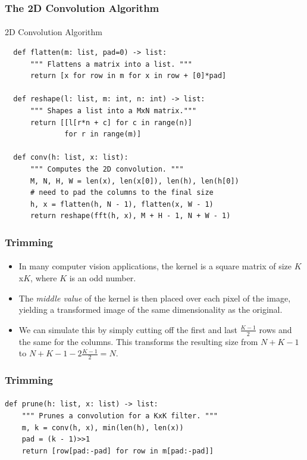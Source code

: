 \documentclass{beamer}                             %
\begin{document}
\begin{frame}[fragile]
\frametitle{The 2D Convolution Algorithm}
\framesubtitle{}
\begin{algorithm}[H]
  \caption{2D Convolution Algorithm}
  \begin{verbatim}
  def flatten(m: list, pad=0) -> list:
      """ Flattens a matrix into a list. """
      return [x for row in m for x in row + [0]*pad]

  def reshape(l: list, m: int, n: int) -> list:
      """ Shapes a list into a MxN matrix."""
      return [[l[r*n + c] for c in range(n)]
              for r in range(m)]

  def conv(h: list, x: list):
      """ Computes the 2D convolution. """
      M, N, H, W = len(x), len(x[0]), len(h), len(h[0])
      # need to pad the columns to the final size
      h, x = flatten(h, N - 1), flatten(x, W - 1)
      return reshape(fft(h, x), M + H - 1, N + W - 1)
  \end{verbatim}
\end{algorithm}
\end{frame}

\begin{frame}
\frametitle{Trimming}
\framesubtitle{}
\begin{itemize}[<+->]
  \item In many computer vision applications, the kernel is a square
    matrix of size \( K \)x\( K \), where \( K \) is an odd number.
  \item The \textit{middle value} of the kernel is then
    placed over each pixel of the image, yielding a transformed
    image of the same dimensionality as the original.
  \item We can simulate this by simply cutting off the first and last
    \( \frac{K - 1}{2} \) rows and the same for the columns.
    This transforms the resulting size from \( N + K - 1 \) to
    \( N + K - 1 - 2 \frac{K - 1}{2} = N \).
\end{itemize}
\end{frame}

\begin{frame}[fragile]
\frametitle{Trimming}
\framesubtitle{}
\begin{verbatim}
def prune(h: list, x: list) -> list:
    """ Prunes a convolution for a KxK filter. """
    m, k = conv(h, x), min(len(h), len(x))
    pad = (k - 1)>>1
    return [row[pad:-pad] for row in m[pad:-pad]]
\end{verbatim}
\end{frame}
\end{document}

